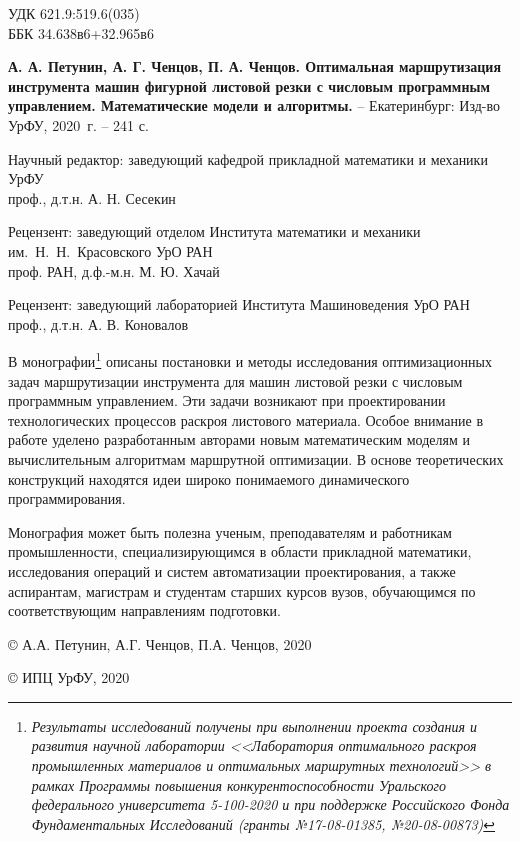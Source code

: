 
\thispagestyle{empty}
{
\setlength{\parindent}{0pt}
\setlength{\parskip}{1em}
\footnotesize

\noindent
УДК  621.9:519.6(035)
\\
ББК  34.638в6+32.965в6

\vspace{2em}

{\bf
А. А. Петунин,
А. Г. Ченцов,
П. А. Ченцов.
Оптимальная маршрутизация инструмента машин фигурной листовой резки
с числовым программным управлением.
Математические модели и алгоритмы.
}
--
Екатеринбург:
Изд-во УрФУ,
2020~г.
--
241 с.

\vspace{2em}

\begin{center}

Научный редактор:
заведующий кафедрой прикладной математики и механики УрФУ
\\
проф., д.т.н. А. Н. Сесекин

Рецензент:
заведующий отделом
Института математики и механики им.~Н.~Н.~Красовского УрО РАН
\\
проф. РАН, д.ф.-м.н. М. Ю. Хачай

Рецензент:
заведующий лабораторией Института Машиноведения УрО РАН
\\
проф., д.т.н. А. В. Коновалов
\end{center}

\vspace{1em}

В монографии\footnote{\it
  Результаты исследований получены при выполнении
  проекта создания и развития научной лаборатории
  <<Лаборатория оптимального раскроя промышленных материалов
  и оптимальных маршрутных технологий>>
  в рамках Программы повышения конкурентоспособности
  Уральского федерального университета
  5-100-2020
  и при поддержке Российского Фонда Фундаментальных Исследований
  (гранты №17-08-01385, №20-08-00873)
}
описаны постановки и методы исследования оптимизационных задач
маршрутизации инструмента для машин листовой резки
с числовым программным управлением.
Эти задачи возникают при проектировании технологических процессов
раскроя листового материала.
Особое внимание в работе уделено разработанным авторами
новым математическим моделям и вычислительным алгоритмам маршрутной оптимизации.
В основе теоретических конструкций находятся идеи
широко понимаемого динамического программирования.

Монография может быть полезна ученым, преподавателям и работникам промышленности,
специализирующимся в области прикладной математики,
исследования операций и систем автоматизации проектирования,
а также аспирантам, магистрам и студентам старших курсов вузов,
обучающимся по соответствующим направлениям подготовки.

\vspace{3em}
{
\setlength{\parindent}{0.5\linewidth}
\setlength{\parskip}{0em}
\scriptsize

\copyright
А.А. Петунин, А.Г. Ченцов, П.А. Ченцов, 2020

\copyright
ИПЦ УрФУ, 2020
}}
